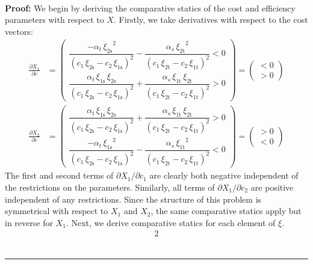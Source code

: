 \documentclass[11pt,a4paper]{extarticle}
\newenvironment{proof}[1][Proof]{\noindent\textbf{#1:} }{\ \rule{0.5em}{0.5em}}
\begin{document}
\hfill \\
\begin{proof}
	We begin by deriving the comparative statics of the cost and efficiency parameters with respect to $X$.   Firstly, we take derivatives with respect to the cost vectors:
	\begin{align*}
	\frac{\partial X_1}{\partial c} &= 
	\begin{pmatrix}
	\dfrac{-\alpha _{t}\,{\xi _{\mathrm{2s}}}^2}{{\left(c_{1}\,\xi _{\mathrm{2s}}-c_{2}\,\xi _{\mathrm{1s}}\right)}^2}-\dfrac{\alpha _{s}\,{\xi _{\mathrm{2t}}}^2}{{\left(c_{1}\,\xi _{\mathrm{2t}}-c_{2}\,\xi _{\mathrm{1t}}\right)}^2}<0 \\
	\dfrac{\alpha _{t}\,\xi _{\mathrm{1s}}\,\xi _{\mathrm{2s}}}{{\left(c_{1}\,\xi _{\mathrm{2s}}-c_{2}\,\xi _{\mathrm{1s}}\right)}^2}+\dfrac{\alpha _{s}\,\xi _{\mathrm{1t}}\,\xi _{\mathrm{2t}}}{{\left(c_{1}\,\xi _{\mathrm{2t}}-c_{2}\,\xi _{\mathrm{1t}}\right)}^2}>0
	\end{pmatrix}
	=
	\begin{pmatrix}
	< 0 \\
	> 0 
	\end{pmatrix} \\
	\frac{\partial X_2}{\partial c} &= 
	\begin{pmatrix}
	\dfrac{\alpha _{t}\,\xi _{\mathrm{1s}}\,\xi _{\mathrm{2s}}}{{\left(c_{1}\,\xi _{\mathrm{2s}}-c_{2}\,\xi _{\mathrm{1s}}\right)}^2}+\dfrac{\alpha _{s}\,\xi _{\mathrm{1t}}\,\xi _{\mathrm{2t}}}{{\left(c_{1}\,\xi _{\mathrm{2t}}-c_{2}\,\xi _{\mathrm{1t}}\right)}^2}>0 \\
	\dfrac{-\alpha _{t}\,{\xi _{\mathrm{1s}}}^2}{{\left(c_{1}\,\xi _{\mathrm{2s}}-c_{2}\,\xi _{\mathrm{1s}}\right)}^2}-\dfrac{\alpha _{s}\,{\xi _{\mathrm{1t}}}^2}{{\left(c_{1}\,\xi _{\mathrm{2t}}-c_{2}\,\xi _{\mathrm{1t}}\right)}^2}<0
	\end{pmatrix}
	=
	\begin{pmatrix}
	> 0 \\
	< 0 
	\end{pmatrix}
	\end{align*}
	The first and second terms of $\partial X_1 / \partial c_1$ are clearly both negative independent of the restrictions on the parameters. Similarly, all terms of  $\partial X_1 / \partial c_2$ are positive independent of any restrictions. Since the structure of this problem is symmetrical with respect to $X_1$ and $X_2$, the same comparative statics apply but in reverse for $X_1$. Next, we derive comparative statics for each element of $\xi$.
	\begin{alignat*}{2}

\end{alignat*}
\end{proof}
\end{document}
